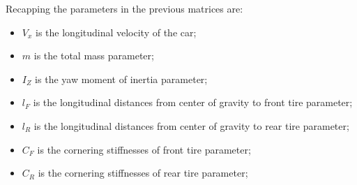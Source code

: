 Recapping the parameters in the previous matrices are:
\begin{itemize}
	\item $V_x$ is the longitudinal velocity of the car;	
	\item $m$ is the total mass parameter; 
	\item $I_Z$ is the yaw moment of inertia parameter;
	\item $l_F$ is the longitudinal distances from center of gravity to front tire parameter;
	\item $l_R$ is the longitudinal distances from center of gravity to rear tire parameter;
	\item $C_F$ is the cornering stiffnesses of front tire parameter;
	\item $C_R$ is the cornering stiffnesses of rear tire parameter;
\end{itemize}
